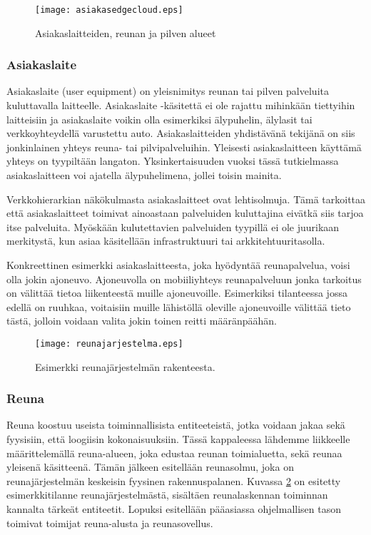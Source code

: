 \begin{figure}[tb]
\texttt{[image: asiakasedgecloud.eps]}
\caption{Asiakaslaitteiden, reunan ja pilven alueet} \label{fig:asiakasedgecloud}
\end{figure}

\subsubsection{Asiakaslaite}
Asiakaslaite (user equipment) on yleisnimitys reunan tai pilven palveluita kuluttavalla laitteelle.
Asiakaslaite -käsitettä ei ole rajattu mihinkään tiettyihin laitteisiin ja asiakaslaite voikin olla esimerkiksi älypuhelin, älylasit tai verkkoyhteydellä varustettu auto. 
Asiakaslaitteiden yhdistävänä tekijänä on siis jonkinlainen yhteys reuna- tai pilvipalveluihin. Yleisesti asiakaslaitteen käyttämä yhteys on tyypiltään langaton. 
Yksinkertaisuuden vuoksi tässä tutkielmassa asiakaslaitteen voi ajatella älypuhelimena, jollei toisin mainita.

Verkkohierarkian näkökulmasta asiakaslaitteet ovat lehtisolmuja. Tämä tarkoittaa että asiakaslaitteet toimivat ainoastaan palveluiden kuluttajina eivätkä siis tarjoa itse palveluita. Myöskään kulutettavien palveluiden tyypillä ei ole juurikaan merkitystä, kun asiaa käsitellään infrastruktuuri tai arkkitehtuuritasolla.

Konkreettinen esimerkki asiakaslaitteesta, joka hyödyntää reunapalvelua, voisi olla jokin ajoneuvo.
Ajoneuvolla on mobiiliyhteys reunapalveluun jonka tarkoitus on välittää tietoa liikenteestä muille ajoneuvoille. Esimerkiksi tilanteessa jossa edellä on ruuhkaa, voitaisiin muille lähistöllä oleville ajoneuvoille välittää tieto tästä, jolloin voidaan valita jokin toinen reitti määränpäähän.

\begin{figure}[tb]
\texttt{[image: reunajarjestelma.eps]}
\caption{Esimerkki reunajärjestelmän rakenteesta.} \label{fig:reunajarjestelma}
\end{figure}


\subsubsection{Reuna} \label{reunatoimijat}
Reuna koostuu useista toiminnallisista entiteeteistä, jotka voidaan jakaa sekä fyysisiin, että loogiisin kokonaisuuksiin. 
Tässä kappaleessa lähdemme liikkeelle määrittelemällä reuna-alueen, joka edustaa reunan toimialuetta, sekä reunaa yleisenä käsitteenä.
Tämän jälkeen esitellään reunasolmu, joka on reunajärjestelmän keskeisin fyysinen rakennuspalanen.
Kuvassa \ref{fig:reunajarjestelma} on esitetty esimerkkitilanne reunajärjestelmästä, sisältäen reunalaskennan toiminnan kannalta tärkeät entiteetit.
Lopuksi esitellään pääasiassa ohjelmallisen tason toimivat toimijat reuna-alusta ja reunasovellus.

